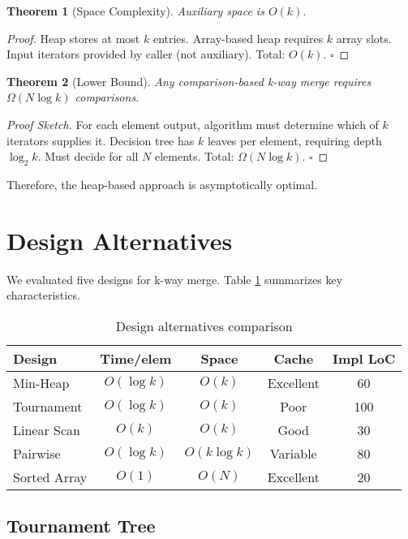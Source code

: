\documentclass[11pt]{article}
\newtheorem{theorem}{Theorem}
\begin{document}
\begin{theorem}[Space Complexity]
Auxiliary space is $O(k)$.
\end{theorem}

\begin{proof}
Heap stores at most $k$ entries. Array-based heap requires $k$ array slots. Input iterators provided by caller (not auxiliary). Total: $O(k)$. $\square$
\end{proof}

\begin{theorem}[Lower Bound]
Any comparison-based k-way merge requires $\Omega(N \log k)$ comparisons.
\end{theorem}

\begin{proof}[Proof Sketch]
For each element output, algorithm must determine which of $k$ iterators supplies it. Decision tree has $k$ leaves per element, requiring depth $\log_2 k$. Must decide for all $N$ elements. Total: $\Omega(N \log k)$. $\square$
\end{proof}

Therefore, the heap-based approach is asymptotically optimal.

\section{Design Alternatives}

We evaluated five designs for k-way merge. Table \ref{tab:design-comparison} summarizes key characteristics.

\begin{table}[h]
\centering
\small
\begin{tabular}{@{}lcccc@{}}
\toprule
\textbf{Design} & \textbf{Time/elem} & \textbf{Space} & \textbf{Cache} & \textbf{Impl LoC} \\ \midrule
Min-Heap & $O(\log k)$ & $O(k)$ & Excellent & 60 \\
Tournament & $O(\log k)$ & $O(k)$ & Poor & 100 \\
Linear Scan & $O(k)$ & $O(k)$ & Good & 30 \\
Pairwise & $O(\log k)$ & $O(k \log k)$ & Variable & 80 \\
Sorted Array & $O(1)$ & $O(N)$ & Excellent & 20 \\ \bottomrule
\end{tabular}
\caption{Design alternatives comparison}
\label{tab:design-comparison}
\end{table}

\subsection{Tournament Tree}
\end{document}
